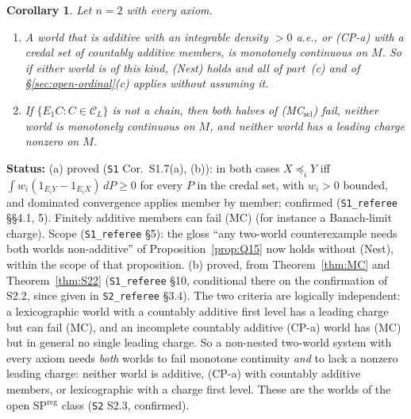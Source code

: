 \documentclass[11pt]{article}
\newtheorem{corollary}[theorem]{Corollary}
\theoremstyle{definition}
\theoremstyle{remark}
\newcommand{\C}{\mathcal C}
\newcommand{\src}[1]{\texttt{#1}}
\newcommand{\status}[1]{\par\smallskip\noindent\textbf{Status:} #1\par\smallskip}
\begin{document}
\begin{corollary}\label{cor:MC}
Let $n=2$ with every axiom.
\begin{enumerate}[leftmargin=*,label=(\alph*)]
\item A world that is additive with an integrable density $>0$ a.e., or (CP-a) with a credal set of countably additive members, is monotonely continuous on $M$. So if either world is of this kind, (Nest) holds and all of part~(c) and of \S\ref{sec:open-ordinal}(c) applies without assuming it.
\item If $\{E_1C:C\in\C_L\}$ is not a chain, then both halves of (MC$_{\mathrm{sel}}$) fail, neither world is monotonely continuous on $M$, and neither world has a leading charge nonzero on $M$.
\end{enumerate}
\end{corollary}
\status{(a) proved (\src{S1} Cor.~S1.7(a), (b)): in both cases $X\preceq_iY$ iff $\int w_i(1_{E_iY}-1_{E_iX})\,dP\ge0$ for every $P$ in the credal set, with $w_i>0$ bounded, and dominated convergence applies member by member; confirmed (\src{S1\_referee} \S\S4.1, 5). Finitely additive members can fail (MC) (for instance a Banach-limit charge). Scope (\src{S1\_referee} \S5): the gloss ``any two-world counterexample needs both worlds non-additive'' of Proposition~\ref{prop:Q15} now holds without (Nest), within the scope of that proposition. (b) proved, from Theorem~\ref{thm:MC} and Theorem~\ref{thm:S22} (\src{S1\_referee} \S10, conditional there on the confirmation of S2.2, since given in \src{S2\_referee} \S3.4). The two criteria are logically independent: a lexicographic world with a countably additive first level has a leading charge but can fail (MC), and an incomplete countably additive (CP-a) world has (MC) but in general no single leading charge. So a non-nested two-world system with every axiom needs \emph{both} worlds to fail monotone continuity \emph{and} to lack a nonzero leading charge: neither world is additive, (CP-a) with countably additive members, or lexicographic with a charge first level. These are the worlds of the open SP$^{\mathrm{reg}}$ class (\src{S2} S2.3, confirmed).}
\end{document}
